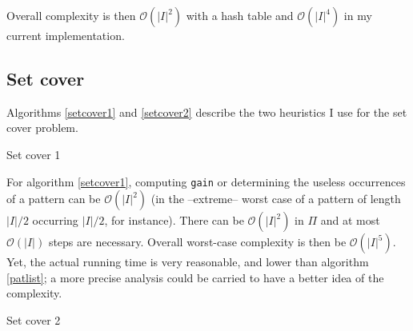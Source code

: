 \documentclass[a4paper,10pt]{article}
\newcommand{\bigO}[1]{\mathcal O\left( #1 \right)}
\begin{document}
Overall complexity is then $\bigO{|I|^2}$ with a hash table and $\bigO{|I|^4}$ in my current implementation.


\subsection*{Set cover}

Algorithms \ref{setcover1} and \ref{setcover2} describe the two heuristics I use for the set cover problem.


\begin{algorithm}
\caption{Set cover 1 \label{setcover1}}
   
 


\end{algorithm}

For algorithm \ref{setcover1}, computing \texttt{gain} or determining the useless occurrences of a pattern can be $\bigO{|I|^2}$ (in the --extreme-- worst case of a pattern of length $|I|/2$ occurring $|I|/2$, for instance). There can be $\bigO{|I|^2}$ in $\Pi$ and at most $\bigO{|I|}$ steps are necessary. Overall worst-case complexity is then be $\bigO{|I|^5}$. Yet, the actual running time is very reasonable, and lower than algorithm \ref{patlist}; a more precise analysis could be carried to have a better idea of the complexity.

\begin{algorithm}
\caption{Set cover 2 \label{setcover2}}
    
  


\end{algorithm}
\end{document}
